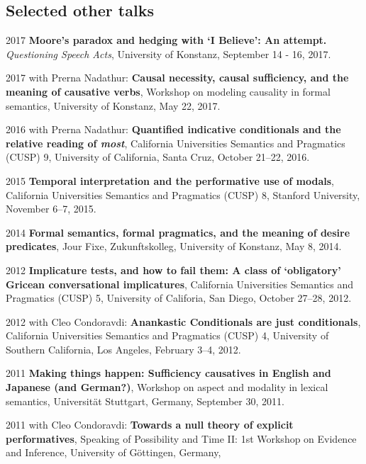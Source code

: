\subsection*{Selected other talks}
\begin{dated}
	\item[2017]
		\textbf{Moore's paradox and hedging with `I Believe': An attempt.} 
		\textit{Questioning Speech Acts}, 
		University of Konstanz, 
		September 14 - 16, 2017.
	\item[2017]
		with Prerna Nadathur: 
		\textbf{Causal necessity, causal sufficiency, and the meaning of causative verbs}, 
		Workshop on modeling causality in formal semantics, 
		University of Konstanz, 
		May 22, 2017.
	\item[2016]
		with Prerna Nadathur: 
		\textbf{Quantified indicative conditionals and the relative reading of {\it most}},
		California Universities Semantics and Pragmatics (CUSP) 9, 
		University of California, Santa Cruz,
		October 21--22, 2016.
	\item[2015]
		\textbf{Temporal interpretation and the performative use of modals}, 
		California Universities Semantics and Pragmatics (CUSP) 8, 
		Stanford University, 
		November 6--7, 2015.
	\item[2014]
		\textbf{Formal semantics, formal pragmatics, and the meaning of desire predicates}, 
		Jour Fixe, Zukunftskolleg, 
		University of Konstanz, 
		May 8, 2014.
	\item[2012]
		\textbf{Implicature tests, and how to fail them: A class of `obligatory' Gricean 
		conversational implicatures}, 
		California Universities Semantics and Pragmatics (CUSP) 5, 
		University of Califoria, San Diego, 
		October 27--28, 2012.
	\item[2012]
		with Cleo Condoravdi: 
		\textbf{Anankastic Conditionals are just conditionals}, 
		California Universities Semantics and Pragmatics (CUSP) 4, 
		University of Southern California, Los Angeles, 
		February 3--4, 2012.
	\item[2011]
		\textbf{Making things happen: Sufficiency causatives in English and Japanese (and German?)},
		Workshop on aspect and modality in lexical semantics, 
		Universit\"at Stuttgart, Germany,  
		September 30, 2011.
	\item[2011]
		with Cleo Condoravdi: 
		\textbf{Towards a null theory of explicit performatives}, 
		Speaking of Possibility and Time II: 1st Workshop on Evidence and Inference, 
		University of G\"ottingen, Germany, 

\end{dated}
